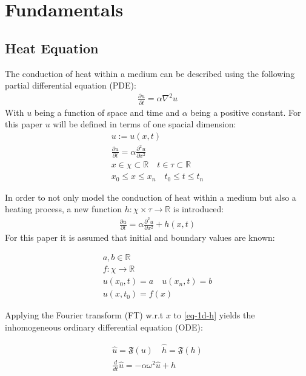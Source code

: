 \chapter{Fundamentals}
\section{Heat Equation}
The conduction of heat  within a medium can be described using the following partial differential equation (PDE):
\begin{gather}
\frac{\partial u}{\partial t} = \alpha \nabla^{2} u
\end{gather}
With \(u\) being a function of space and time and \(\alpha\) being a positive constant.
For this paper \(u\) will be defined in terms of one spacial dimension:
\begin{gather}
u := u(x, t) \\
\frac{\partial u}{\partial t} = \alpha \frac{\partial^{2} u}{\partial x^{2}} \\
x \in \chi \subset \mathbb{R} \quad t \in \tau \subset \mathbb{R} \\
x_{0} \leq x \leq x_{n} \quad t_{0} \leq t \leq t_{n} 
\end{gather}
\cite{Gustafsson2011}

In order to not only model the conduction of heat within a medium but also a heating process, a new function \(h: \chi \times \tau \rightarrow  \mathbb{R}\) is introduced:
\begin{gather}
\frac{\partial u}{\partial t} = \alpha \frac{\partial^{2} u}{\partial x^{2}} + h(x,t) \label{eq-1d-h}
\end{gather}
For this paper it is assumed that initial and boundary values are known:

\begin{gather}
a, b \in \mathbb{R} \\
f: \chi \rightarrow \mathbb{R} \\
u(x_{0}, t) = a \quad u(x_{n}, t) = b \\
u(x, t_{0}) = f(x) 
\end{gather} 

Applying the Fourier transform (FT) w.r.t \(x\) to \ref{eq-1d-h} yields the inhomogeneous ordinary differential equation (ODE):

\begin{gather}
\hat{u} = \mathfrak{F}(u) \quad \hat{h} = \mathfrak{F}(h) \\
\frac{d}{dt} \hat{u} = -\alpha\omega^{2}\hat{u} + \hat{h} \label{eq-1d-h-ft}
\end{gather}

